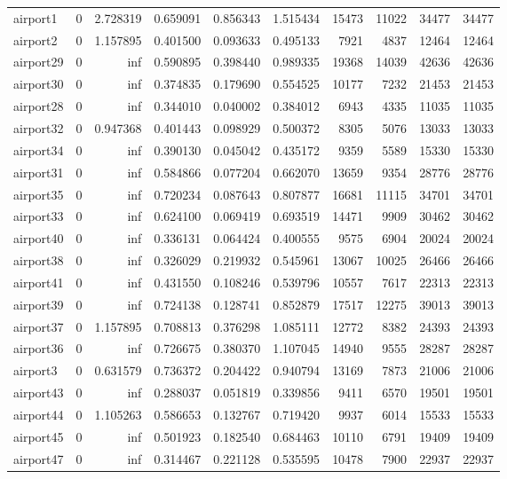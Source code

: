\begin{longtable}{|l|r|r|r|r|r|r|r|r|r|}
airport1 & 0 & 2.728319 & 0.659091 & 0.856343 & 1.515434 & 15473 & 11022 & 34477 & 34477 \\
airport2 & 0 & 1.157895 & 0.401500 & 0.093633 & 0.495133 & 7921 & 4837 & 12464 & 12464 \\
airport29 & 0 & inf & 0.590895 & 0.398440 & 0.989335 & 19368 & 14039 & 42636 & 42636 \\
airport30 & 0 & inf & 0.374835 & 0.179690 & 0.554525 & 10177 & 7232 & 21453 & 21453 \\
airport28 & 0 & inf & 0.344010 & 0.040002 & 0.384012 & 6943 & 4335 & 11035 & 11035 \\
airport32 & 0 & 0.947368 & 0.401443 & 0.098929 & 0.500372 & 8305 & 5076 & 13033 & 13033 \\
airport34 & 0 & inf & 0.390130 & 0.045042 & 0.435172 & 9359 & 5589 & 15330 & 15330 \\
airport31 & 0 & inf & 0.584866 & 0.077204 & 0.662070 & 13659 & 9354 & 28776 & 28776 \\
airport35 & 0 & inf & 0.720234 & 0.087643 & 0.807877 & 16681 & 11115 & 34701 & 34701 \\
airport33 & 0 & inf & 0.624100 & 0.069419 & 0.693519 & 14471 & 9909 & 30462 & 30462 \\
airport40 & 0 & inf & 0.336131 & 0.064424 & 0.400555 & 9575 & 6904 & 20024 & 20024 \\
airport38 & 0 & inf & 0.326029 & 0.219932 & 0.545961 & 13067 & 10025 & 26466 & 26466 \\
airport41 & 0 & inf & 0.431550 & 0.108246 & 0.539796 & 10557 & 7617 & 22313 & 22313 \\
airport39 & 0 & inf & 0.724138 & 0.128741 & 0.852879 & 17517 & 12275 & 39013 & 39013 \\
airport37 & 0 & 1.157895 & 0.708813 & 0.376298 & 1.085111 & 12772 & 8382 & 24393 & 24393 \\
airport36 & 0 & inf & 0.726675 & 0.380370 & 1.107045 & 14940 & 9555 & 28287 & 28287 \\
airport3 & 0 & 0.631579 & 0.736372 & 0.204422 & 0.940794 & 13169 & 7873 & 21006 & 21006 \\
airport43 & 0 & inf & 0.288037 & 0.051819 & 0.339856 & 9411 & 6570 & 19501 & 19501 \\
airport44 & 0 & 1.105263 & 0.586653 & 0.132767 & 0.719420 & 9937 & 6014 & 15533 & 15533 \\
airport45 & 0 & inf & 0.501923 & 0.182540 & 0.684463 & 10110 & 6791 & 19409 & 19409 \\
airport47 & 0 & inf & 0.314467 & 0.221128 & 0.535595 & 10478 & 7900 & 22937 & 22937 \\

\end{longtable}
